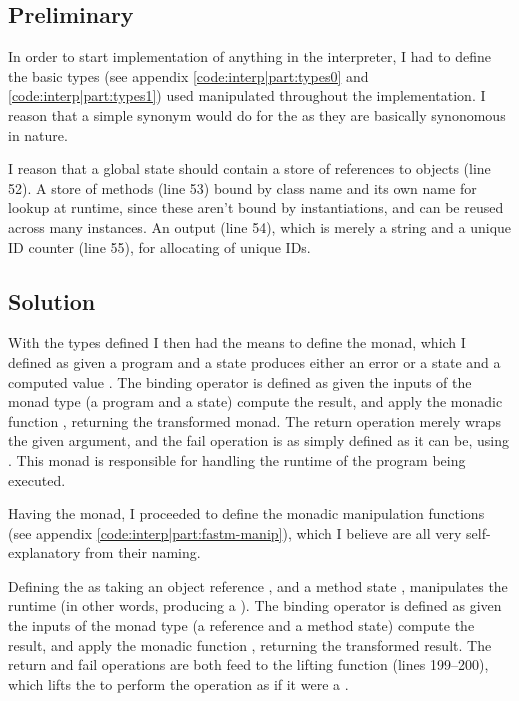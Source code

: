 %
%

\subsection{Preliminary}
In order to start implementation of anything in the interpreter, I had to
define the basic types (see appendix \ref{code:interp|part:types0} and
\ref{code:interp|part:types1}) used manipulated throughout the implementation.
I reason that a simple  synonym would do for the  as
they are basically synonomous in nature.

I reason that a global state should contain a store of references to objects
(line 52). A store of methods (line 53) bound by class name and its own name
for lookup at runtime, since these aren't bound by instantiations, and can be
reused across many instances. An output (line 54), which is merely a string
and a unique ID counter (line 55), for allocating of unique IDs.

\subsection{Solution}
With the types defined I then had the means to define the 
monad, which I defined as given a program  and a state
 produces either an error or a state and a computed value
. The binding operator is defined as given the inputs
of the monad type (a program and a state) compute the result, and apply the
monadic function , returning the transformed monad. The return
operation merely wraps the given argument, and the fail operation is as simply
defined as it can be, using . This monad is responsible for
handling the runtime of the program being executed.

Having the  monad, I proceeded to define the monadic manipulation
functions (see appendix \ref{code:interp|part:fastm-manip}), which I believe
are all very self-explanatory from their naming.

Defining the  as taking an object reference
, and a method state , manipulates the
runtime (in other words, producing a ). The binding operator is
defined as given the inputs of the monad type (a reference and a method state)
compute the result, and apply the monadic function , returning the
transformed result. The return and fail operations are both feed to the
lifting function (lines 199--200), which lifts the  to
perform the operation as if it were a .

